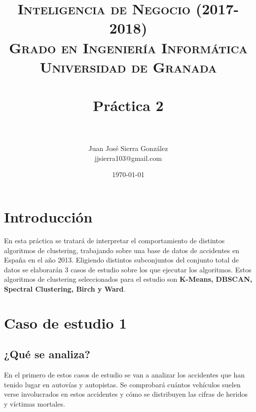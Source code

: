 

\title{	
	\normalfont \normalsize 
	\textsc{\textbf{Inteligencia de Negocio (2017-2018)} \\ Grado en Ingeniería Informática \\ Universidad de Granada} \\ [25pt] 
	\horrule{0.5pt} \\[0.4cm]
	\huge Práctica 2 \\
	\horrule{2pt} \\[0.5cm]
}

\author{Juan José Sierra González \\ jjsierra103@gmail.com}

\date{\normalsize\today}


	\maketitle
	\thispagestyle{empty}
	
	\newpage
	
	\tableofcontents
	
	\listoffigures
	
	\listoftables
	
	\newpage
	
	\section{Introducción}
	En esta práctica se tratará de interpretar el comportamiento de distintos algoritmos de clustering, trabajando sobre una base de datos de accidentes en España en el año 2013. Eligiendo distintos subconjuntos del conjunto total de datos se elaborarán 3 casos de estudio sobre los que ejecutar los algoritmos. Estos algoritmos de clustering seleccionados para el estudio son \textbf{K-Means, DBSCAN, Spectral Clustering, Birch y Ward}.
	
	\section{Caso de estudio 1}
	
	\subsection{¿Qué se analiza?}
	En el primero de estos casos de estudio se van a analizar los accidentes que han tenido lugar en autovías y autopistas. Se comprobará cuántos vehículos suelen verse involucrados en estos accidentes y cómo se distribuyen las cifras de heridos y víctimas mortales.
	
